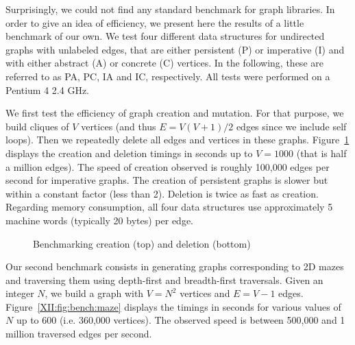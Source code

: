 Surprisingly, we could not find any standard benchmark for graph
libraries. In order to give an idea of \ocamlgraph efficiency, we
present here the results of a little benchmark of our own.  We test
four different data structures for undirected graphs with unlabeled
edges, that are either persistent (P) or imperative (I) and with
either abstract (A) or concrete (C) vertices. In the following, these
are referred to as PA, PC, IA and IC, respectively.  All tests were
performed on a Pentium 4 2.4 GHz.

We first test the efficiency of graph creation and mutation.  For that
purpose, we build cliques of $V$ vertices (and thus $E=V(V+1)/2$
edges since we include self loops).  Then we repeatedly delete all
edges and vertices in these graphs.  Figure~\ref{XII:fig:bench:build}
displays the creation and deletion timings in seconds up to $V=1000$
(that is half a million edges).  The speed of creation observed is
roughly 100,000 edges per second for imperative graphs. The creation
of persistent graphs is slower but within a constant factor (less than
2). Deletion is twice as fast as creation.  Regarding memory
consumption, all four data structures use approximately 5 machine words
(typically 20 bytes) per edge.

\begin{figure}
  \centering%
  

  
  \caption{Benchmarking creation (top) and deletion (bottom)}
  \label{XII:fig:bench:build}
\end{figure}

Our second benchmark consists in generating graphs corresponding to 2D
mazes and traversing them using depth-first and breadth-first
traversals. Given an integer $N$, we build a graph with $V=N^2$
vertices and $E=V-1$ edges.  Figure~\ref{XII:fig:bench:maze} displays
the timings in seconds for various values of $N$ up to 600 (i.e.
360,000 vertices). The observed speed is between 500,000 and 1 million
traversed edges per second.

